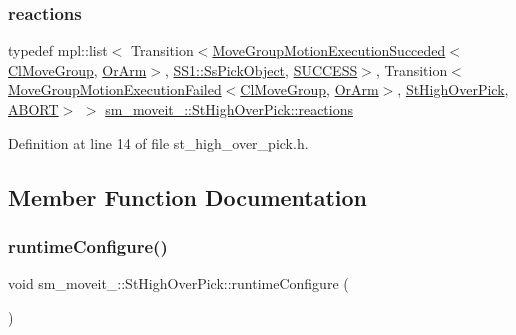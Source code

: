 \subsubsection{\texorpdfstring{reactions}{reactions}}
{\footnotesize\ttfamily typedef mpl\+::list$<$ Transition$<$\hyperlink{structmove__group__interface__client_1_1MoveGroupMotionExecutionSucceded}{Move\+Group\+Motion\+Execution\+Succeded}$<$\hyperlink{classmove__group__interface__client_1_1ClMoveGroup}{Cl\+Move\+Group}, \hyperlink{classsm__moveit__3_1_1OrArm}{Or\+Arm}$>$, \hyperlink{structsm__moveit__3_1_1SS1_1_1SsPickObject}{S\+S1\+::\+Ss\+Pick\+Object}, \hyperlink{classSUCCESS}{S\+U\+C\+C\+E\+SS}$>$, Transition$<$\hyperlink{structmove__group__interface__client_1_1MoveGroupMotionExecutionFailed}{Move\+Group\+Motion\+Execution\+Failed}$<$\hyperlink{classmove__group__interface__client_1_1ClMoveGroup}{Cl\+Move\+Group}, \hyperlink{classsm__moveit__3_1_1OrArm}{Or\+Arm}$>$, \hyperlink{structsm__moveit__3_1_1StHighOverPick}{St\+High\+Over\+Pick}, \hyperlink{classABORT}{A\+B\+O\+RT}$>$ $>$ \hyperlink{structsm__moveit__3_1_1StHighOverPick_a040b8ba065c27d3103b57f449a3b637f}{sm\+\_\+moveit\+\_\+::\+St\+High\+Over\+Pick\+::reactions}}



Definition at line 14 of file st\+\_\+high\+\_\+over\+\_\+pick.\+h.



\subsection{Member Function Documentation}
\mbox{\label{structsm__moveit__3_1_1StHighOverPick_ad1cbb7d9d2819d73850de1613b6cad9a}} 
\subsubsection{\texorpdfstring{runtime\+Configure()}{runtimeConfigure()}}
{\footnotesize\ttfamily void sm\+\_\+moveit\+\_\+::\+St\+High\+Over\+Pick\+::runtime\+Configure (\begin{DoxyParamCaption}{ }\end{DoxyParamCaption})\hspace{0.3cm}{\ttfamily [inline]}}



